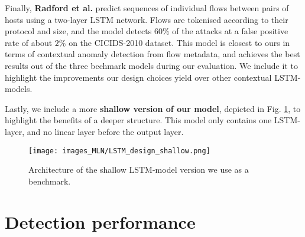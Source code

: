 Finally, \textbf{Radford et al.} \cite{radford2018network} predict sequences of individual flows between pairs of hosts using a two-layer LSTM network. Flows are tokenised according to their protocol and size, and the model detects $60\%$ of the attacks at a false positive rate of about $2\%$ on the CICIDS-2010 dataset. %
This model is closest to ours in terms of contextual anomaly detection from flow metadata, and achieves the best results out of the three bechmark models during our evaluation. We include it to highlight the improvements our design choices yield over other contextual LSTM-models.



Lastly, we include a more \textbf{shallow version of our model}, depicted in Fig. \ref{figF:rnn_FSA2}, to highlight the benefits of a deeper structure. This model only contains one LSTM-layer, and no linear layer before the output layer. 

\begin{figure}
    \begin{center}
      \texttt{[image: images\_MLN/LSTM\_design\_shallow.png]}
    \end{center}
    \vspace{-15pt}
    \caption{Architecture of the shallow LSTM-model version we use as a benchmark.}\label{figF:rnn_FSA2}
\end{figure}



\section{Detection performance}\label{SecF:Det}

